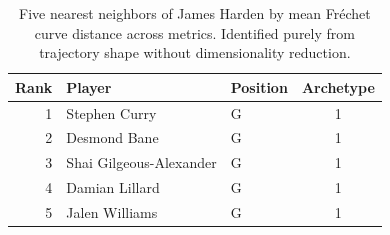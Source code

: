 \begin{table}[htbp]
  \centering\small
  \begin{tabular}{rllc}
    \toprule
    Rank & Player & Position & Archetype \\
    \midrule
    1 & Stephen Curry & G & 1 \\
    2 & Desmond Bane & G & 1 \\
    3 & Shai Gilgeous-Alexander & G & 1 \\
    4 & Damian Lillard & G & 1 \\
    5 & Jalen Williams & G & 1 \\
    \bottomrule
  \end{tabular}
  \caption{Five nearest neighbors of James Harden by mean Fr\'{e}chet curve distance across metrics. Identified purely from trajectory shape without dimensionality reduction.}
  \label{tab:James_Harden_frechet_curve_neighbors}
\end{table}

